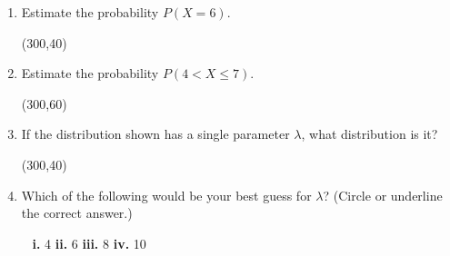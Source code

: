 \documentclass[12pt,twoside]{article}
\newcommand{\pts}[1]{\marginpar{ \small\hspace{0pt} \textit{[#1]} } }
\newcommand{\?}{\stackrel{?}{=}}
\begin{document}
  \begin{enumerate}[\bf (a)]
    \item Estimate the probability $P(X = 6)$. \pts{1} %

    \begin{minipage}[]{.8\linewidth}
      \framebox(300,40){\Huge\phantom{t}}     
    \end{minipage}
  
    \bigskip
    \bigskip

  \item Estimate the probability $P(4 < X \le 7)$. \pts{2}  
  
  \begin{minipage}[]{.8\linewidth}
    \framebox(300,60){\Huge\phantom{t}}     
  \end{minipage}

  \bigskip
  \bigskip

  \item If the distribution shown has a single parameter $\lambda$, what distribution is it? \pts{1}
  
      \begin{minipage}[]{.8\linewidth}
      \framebox(300,40){\Huge\phantom{t}}     
    \end{minipage}
  
  \item Which of the following would be your best guess for $\lambda$? (Circle or underline the correct answer.)\pts{1}
    \begin{center}
    ~ \hfill {\bf i.} 4 \hfill {\bf ii.} 6 \hfill {\bf iii.} 8 \hfill {\bf iv.} 10 \hfill~
    \end{center}
  \end{enumerate}
   \eject


\end{document}
